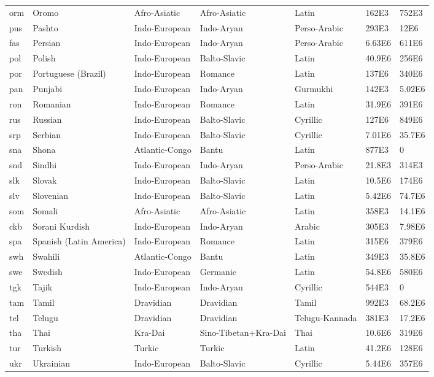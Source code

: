 \begin{tabular}{l l l l lll}
orm	& Oromo	&	Afro-Asiatic	&	Afro-Asiatic	&	Latin	&	162E3	&	752E3	\\
pus	& Pashto	&	Indo-European	&	Indo-Aryan	&	Perso-Arabic	&	293E3	&	12E6	\\
fas	& Persian	&	Indo-European	&	Indo-Aryan	&	Perso-Arabic	&	6.63E6	&	611E6	\\
pol	& Polish	&	Indo-European	&	Balto-Slavic	&	Latin	&	40.9E6	&	256E6	\\
por	& Portuguese   (Brazil) 	&	Indo-European	&	Romance	&	Latin	&	137E6	&	340E6	\\
pan	& Punjabi	&	Indo-European	&	Indo-Aryan	&	Gurmukhi	&	142E3	&	5.02E6	\\
ron	& Romanian	&	Indo-European	&	Romance	&	Latin	&	31.9E6	&	391E6	\\
rus	& Russian	&	Indo-European	&	Balto-Slavic	&	Cyrillic	&	127E6	&	849E6	\\
srp	& Serbian	&	Indo-European	&	Balto-Slavic	&	Cyrillic	&	7.01E6	&	35.7E6	\\
sna	& Shona	&	Atlantic-Congo	&	Bantu	&	Latin	&	877E3	&	0	\\
snd	& Sindhi	&	Indo-European	&	Indo-Aryan	&	Perso-Arabic	&	21.8E3	&	314E3	\\
slk	& Slovak	&	Indo-European	&	Balto-Slavic	&	Latin	&	10.5E6	&	174E6	\\
slv	& Slovenian	&	Indo-European	&	Balto-Slavic	&	Latin	&	5.42E6	&	74.7E6	\\
som	& Somali	&	Afro-Asiatic	&	Afro-Asiatic	&	Latin	&	358E3	&	14.1E6	\\
ckb	& Sorani Kurdish	&	Indo-European	&	Indo-Aryan	&	Arabic	&	305E3	&	7.98E6	\\
spa	& Spanish   (Latin America) 	&	Indo-European	&	Romance	&	Latin	&	315E6	&	379E6	\\
swh	& Swahili	&	Atlantic-Congo	&	Bantu	&	Latin	&	349E3	&	35.8E6	\\
swe	& Swedish	&	Indo-European	&	Germanic	&	Latin	&	54.8E6	&	580E6	\\
tgk	& Tajik	&	Indo-European	&	Indo-Aryan	&	Cyrillic	&	544E3	&	0	\\
tam	& Tamil	&	Dravidian	&	Dravidian	&	Tamil	&	992E3	&	68.2E6	\\
tel	& Telugu	&	Dravidian	&	Dravidian	&	  Telugu-Kannada 	&	381E3	&	17.2E6	\\
tha	& Thai	&	Kra-Dai	&	  Sino-Tibetan+Kra-Dai 	&	Thai	&	10.6E6	&	319E6	\\
tur	& Turkish	&	Turkic	&	Turkic	&	Latin	&	41.2E6	&	128E6	\\
ukr	& Ukrainian	&	Indo-European	&	Balto-Slavic	&	Cyrillic	&	5.44E6	&	357E6	\\

\end{tabular}
